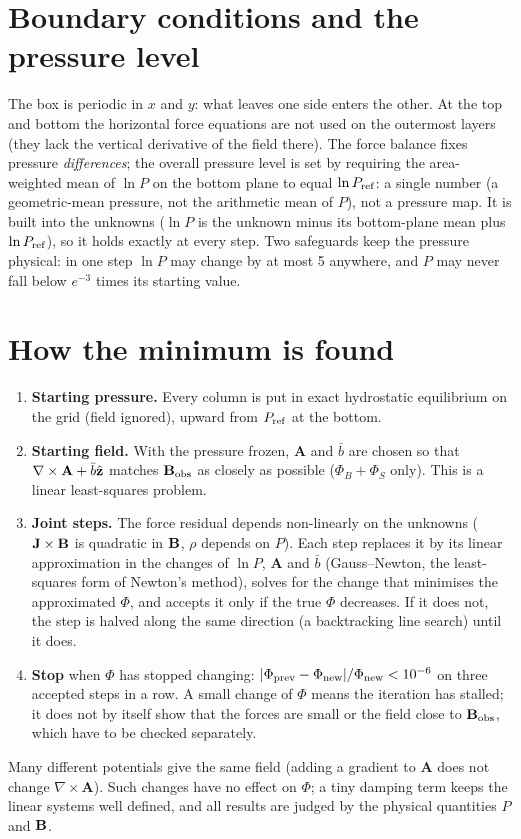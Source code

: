 \section{Boundary conditions and the pressure level}
The box is periodic in $x$ and $y$: what leaves one side enters the other. At the top and bottom the horizontal force
equations are not used on the outermost layers (they lack the vertical derivative of the field there). The force balance
fixes pressure \emph{differences}; the overall pressure level is set by requiring the area-weighted mean of $\ln P$ on the bottom
plane to equal $\ln P_{\rm ref}$: a single number (a geometric-mean pressure, not the arithmetic mean of $P$), not a pressure
map. It is built into the unknowns ($\ln P$ is the unknown minus its bottom-plane mean plus $\ln P_{\rm ref}$), so it holds
exactly at every step. Two safeguards keep the pressure physical: in one step $\ln P$
may change by at most 5 anywhere, and $P$ may never fall below $e^{-3}$ times its starting value.

\section{How the minimum is found}
\begin{enumerate}
\item \textbf{Starting pressure.} Every column is put in exact hydrostatic equilibrium on the grid (field ignored),
upward from $P_{\rm ref}$ at the bottom.
\item \textbf{Starting field.} With the pressure frozen, $\mathbf A$ and $\bar b$ are chosen so that $\nabla\times\mathbf A+\bar b\hat{\mathbf z}$
matches $\mathbf B_{\rm obs}$ as closely as possible ($\Phi_B+\Phi_S$ only). This is a linear least-squares problem.
\item \textbf{Joint steps.} The force residual depends non-linearly on the unknowns ($\mathbf J\times\mathbf B$ is quadratic in $\mathbf B$,
$\rho$ depends on $P$). Each step replaces it by its linear approximation in the changes of $\ln P$, $\mathbf A$ and
$\bar b$ (Gauss--Newton, the least-squares form of Newton's method), solves for the change that minimises the
approximated $\Phi$, and accepts it only if the true $\Phi$ decreases. If it does not, the step is halved along the same
direction (a backtracking line search) until it does.
\item \textbf{Stop} when $\Phi$ has stopped changing: $|\Phi_{\rm prev}-\Phi_{\rm new}|/\Phi_{\rm new}<10^{-6}$ on three
accepted steps in a row. A small change of $\Phi$ means the iteration has stalled; it does not by itself show that the
forces are small or the field close to $\mathbf B_{\rm obs}$, which have to be checked separately.
\end{enumerate}
Many different potentials give the same field (adding a gradient to $\mathbf A$ does not change $\nabla\times\mathbf A$).
Such changes have no effect on $\Phi$; a tiny damping term keeps the linear systems well defined, and all results are judged
by the physical quantities $P$ and $\mathbf B$.

